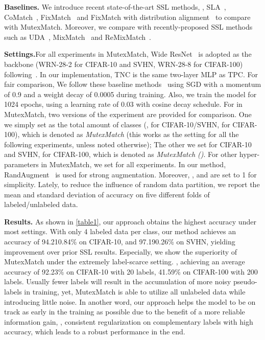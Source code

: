 \documentclass[lettersize,journal]{IEEEtran}
\theoremstyle{plain}
\theoremstyle{definition}
\theoremstyle{remark}
\begin{document}
\noindent\textbf{Baselines.} We introduce recent state-of-the-art SSL methods, \ie, SLA~\cite{tai2021sinkhorn}, CoMatch~\cite{li2021comatch}, FixMatch~\cite{sohn2020fixmatch} and FixMatch with distribution
alignment~\cite{berthelot2020remixmatch} to compare with MutexMatch. Moreover, we compare  with recently-proposed SSL methods such as UDA~\cite{xie2020unsupervised}, MixMatch~\cite{berthelot2019mixmatch} and ReMixMatch~\cite{berthelot2020remixmatch}. 

\noindent\textbf{Settings.}\quad For all experiments in MutexMatch, Wide ResNet~\cite{zagoruyko2016wide} is adopted as the backbone (WRN-28-2 for CIFAR-10 and SVHN,  WRN-28-8 for CIFAR-100) following~\cite{sohn2020fixmatch}. In our implementation, TNC is the same two-layer MLP as TPC. For fair comparison, We follow these baseline methods~\cite{sohn2020fixmatch,li2021comatch} using SGD with a momentum of 0.9 and a weight decay of 0.0005 during training. Also, we train the model for 1024 epochs, using a learning rate of 0.03 with cosine decay schedule. 
For  in MutexMatch, two versions of the experiment are provided for comparison. One  we simply set  as the total amount of classes  (\ie,  for CIFAR-10/SVHN,  for CIFAR-100), which is denoted as \textit{MutexMatch} (this works as the setting for all the following experiments, unless noted otherwise); The other we set  for CIFAR-10 and SVHN,  for CIFAR-100, which is denoted as \textit{MutexMatch ()}.
For other hyper-parameters in MutexMatch,
we set  for all experiments.
In our method, RandAugment~\cite{cubuk2020randaugment} is used for strong augmentation. Moreover, ,  and  are set to 1 for simplicity. Lately, to reduce the influence of random data partition, we report the mean
and standard deviation of accuracy on five different folds of labeled/unlabeled data.

\noindent\textbf{Results.} As shown in \cref{table1}, our approach obtains the highest accuracy under most settings.
With only 4 labeled data per class, our method achieves an accuracy of 94.210.84\% on CIFAR-10, and 97.190.26\% on SVHN, yielding improvement over prior SSL results. Especially, we show the superiority of MutexMatch under the extremely label-scarce setting.
\eg, achieving an average accuracy of 92.23\% on CIFAR-10 with 20 labels, 41.59\% on CIFAR-100 with 200 labels. 
Usually fewer labels will result in the accumulation of more noisy pseudo-labels in training, yet, MutexMatch is able to utilize all unlabeled data while introducing little noise. In another word, our approach helps the model to be on track as early in the training as possible due to the benefit of a more reliable information gain, \ie, consistent regularization on complementary labels with high accuracy, which leads to a robust performance in the end.
\end{document}
